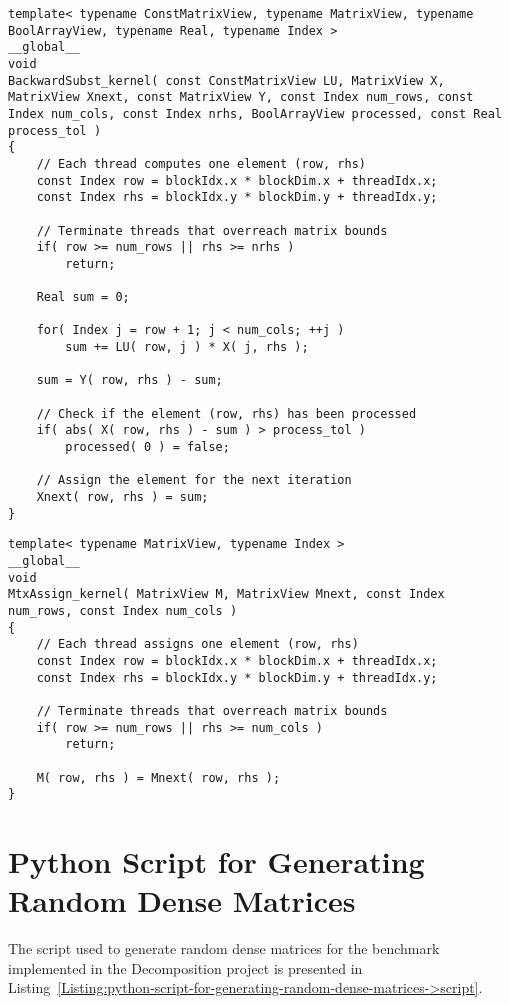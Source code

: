 \begin{lstlisting}[caption={Implementation of the \code{BackwardSubst\_kernel()} kernel which computes one backward-substitution iteration.},label={Listing:ISxPP-implementation->kernels->backward-substitution}]
template< typename ConstMatrixView, typename MatrixView, typename BoolArrayView, typename Real, typename Index >
__global__
void
BackwardSubst_kernel( const ConstMatrixView LU, MatrixView X, MatrixView Xnext, const MatrixView Y, const Index num_rows, const Index num_cols, const Index nrhs, BoolArrayView processed, const Real process_tol )
{
	// Each thread computes one element (row, rhs)
	const Index row = blockIdx.x * blockDim.x + threadIdx.x;
	const Index rhs = blockIdx.y * blockDim.y + threadIdx.y;
	
	// Terminate threads that overreach matrix bounds
	if( row >= num_rows || rhs >= nrhs )
		return;
	
	Real sum = 0;
	
	for( Index j = row + 1; j < num_cols; ++j )
		sum += LU( row, j ) * X( j, rhs );
	
	sum = Y( row, rhs ) - sum;
	
	// Check if the element (row, rhs) has been processed
	if( abs( X( row, rhs ) - sum ) > process_tol )
		processed( 0 ) = false;
	
	// Assign the element for the next iteration
	Xnext( row, rhs ) = sum;
}
\end{lstlisting}

\begin{lstlisting}[caption={Implementation of the \code{MtxAssign\_kernel()} kernel that assigns values of the next iteration to the matrix representing the current iteration.},label={Listing:ISxPP-implementation->kernels->matrix-assign}]
template< typename MatrixView, typename Index >
__global__
void
MtxAssign_kernel( MatrixView M, MatrixView Mnext, const Index num_rows, const Index num_cols )
{
	// Each thread assigns one element (row, rhs)
	const Index row = blockIdx.x * blockDim.x + threadIdx.x;
	const Index rhs = blockIdx.y * blockDim.y + threadIdx.y;
	
	// Terminate threads that overreach matrix bounds
	if( row >= num_rows || rhs >= num_cols )
		return;
	
	M( row, rhs ) = Mnext( row, rhs );
}
\end{lstlisting}





\chapter{Python Script for Generating Random Dense Matrices}\label{Appendix:python-script-for-generating-random-dense-matrices}
The script used to generate random dense matrices for the benchmark implemented in the Decomposition project is presented in Listing~\ref{Listing:python-script-for-generating-random-dense-matrices->script}. 


